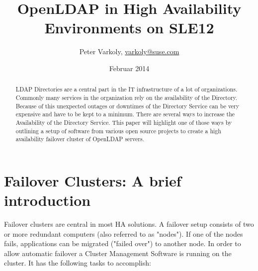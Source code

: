 \documentclass[a4paper,11pt,DIV=12]{scrartcl}
\title{OpenLDAP in High Availability Environments on SLE12}
\author{Peter Varkoly, \href{mailto:varkoly@suse.com}{varkoly@suse.com}}
\date{Februar 2014}
\begin{document}
\maketitle
\begin{abstract}
    LDAP Directories are a central part in the IT infrastructure of a lot of
    organizations. Commonly many services in the organization rely on the
    availability of the Directory. Because of this unexpected outages or
    downtimes of the Directory Service can be very expensive and have to be kept
    to a minimum. There are several ways to increase the Availability of the
    Directory Service. This paper will highlight one of those ways by outlining
    a setup of software from various open source projects to create a high
    availability failover cluster of OpenLDAP servers.
\end{abstract}

\section{Failover Clusters: A brief introduction}
    Failover clusters are central in most HA solutions. A failover setup
    consists of two or more redundant computers (also referred to as "nodes").
    If one of the nodes fails, applications can be migrated ("failed
    over") to another node.
    In order to allow automatic failover a Cluster Management Software
    is running on the cluster. It has the following tasks to accomplish:
\end{document}
